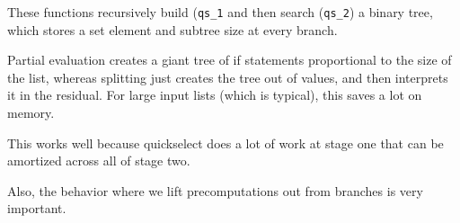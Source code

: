 These functions recursively build ({\tt qs\_1} and then search ({\tt qs\_2}) a binary tree,
which stores a set element and subtree size at every branch.

Partial evaluation creates a giant tree of if statements proportional to the size of the list,
whereas splitting just creates the tree out of values, and then interprets it in the residual.
For large input lists (which is typical), this saves a lot on memory.

This works well because quickselect does a lot of work at stage one that can be amortized across all of stage two.

Also, the behavior where we lift precomputations out from branches is very important.

%
%
%
%
